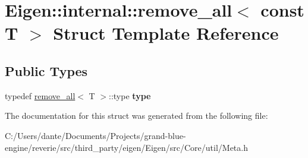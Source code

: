 \hypertarget{struct_eigen_1_1internal_1_1remove__all_3_01const_01_t_01_4}{}\section{Eigen\+::internal\+::remove\+\_\+all$<$ const T $>$ Struct Template Reference}
\label{struct_eigen_1_1internal_1_1remove__all_3_01const_01_t_01_4}
\subsection*{Public Types}
\begin{DoxyCompactItemize}
\item 
\mbox{\label{struct_eigen_1_1internal_1_1remove__all_3_01const_01_t_01_4_ae7e1810cbed71c9b3589fffe082f9ef0}} 
typedef \mbox{\hyperlink{struct_eigen_1_1internal_1_1remove__all}{remove\+\_\+all}}$<$ T $>$\+::type {\bfseries type}
\end{DoxyCompactItemize}


The documentation for this struct was generated from the following file\+:\begin{DoxyCompactItemize}
\item 
C\+:/\+Users/dante/\+Documents/\+Projects/grand-\/blue-\/engine/reverie/src/third\+\_\+party/eigen/\+Eigen/src/\+Core/util/Meta.\+h\end{DoxyCompactItemize}
